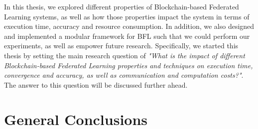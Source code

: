 In this thesis, we explored different properties of Blockchain-based Federated Learning systems, as well as how those properties impact the system in terms of execution time, accuracy and resource consumption. In addition, we also designed and implemented a modular framework for BFL such that we could perform our experiments, as well as empower future research. Specifically, we started this thesis by setting the main research question of \textit{"What is the impact of different Blockchain-based Federated Learning properties and techniques on execution time, convergence and accuracy, as well as communication and computation costs?"}. The answer to this question will be discussed further ahead.

\section{General Conclusions}\label{conclusions:general}



    




